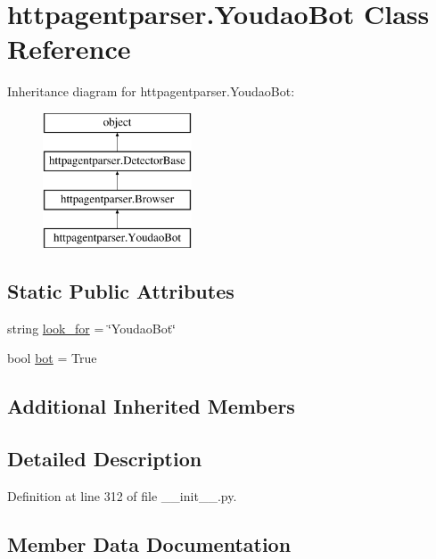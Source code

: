 \hypertarget{classhttpagentparser_1_1_youdao_bot}{}\section{httpagentparser.\+Youdao\+Bot Class Reference}
\label{classhttpagentparser_1_1_youdao_bot}
Inheritance diagram for httpagentparser.\+Youdao\+Bot\+:\begin{figure}[H]
\begin{center}
\leavevmode
\includegraphics[height=4.000000cm]{classhttpagentparser_1_1_youdao_bot}
\end{center}
\end{figure}
\subsection*{Static Public Attributes}
\begin{DoxyCompactItemize}
\item 
string \hyperlink{classhttpagentparser_1_1_youdao_bot_a9ea724988537ace0b01890a8c5683d01}{look\+\_\+for} = \char`\"{}Youdao\+Bot\char`\"{}
\item 
bool \hyperlink{classhttpagentparser_1_1_youdao_bot_af53c2ac8abe6dbf983cf4c9d7063915a}{bot} = True
\end{DoxyCompactItemize}
\subsection*{Additional Inherited Members}


\subsection{Detailed Description}


Definition at line 312 of file \+\_\+\+\_\+init\+\_\+\+\_\+.\+py.



\subsection{Member Data Documentation}
\hypertarget{classhttpagentparser_1_1_youdao_bot_af53c2ac8abe6dbf983cf4c9d7063915a}{}\label{classhttpagentparser_1_1_youdao_bot_af53c2ac8abe6dbf983cf4c9d7063915a} 
